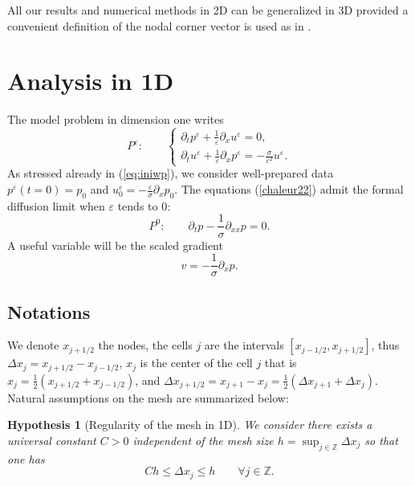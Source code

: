 \documentclass[a4paper,french,english,10pt]{article}
\newcommand\eps{\varepsilon}
\newcommand{\dx}{\partial_x}
\newcommand{\dt}{\partial_t}
\newtheorem{hyp}[theorem]{Hypothesis}
\begin{document}
All our results and numerical methods in 2D can be generalized in 3D 
provided a convenient definition of the nodal corner vector is used as in \cite{de10}.
 
\section{Analysis in 1D} \label{sec:2}



The model problem in dimension one writes
\begin{equation}\label{chaleur22}
P^\varepsilon: \qquad
 \left \{
\begin{array}{lll}
\partial_t p^{\eps} + \frac{1}{\eps}\partial_x u^{\eps} =0, \\
\partial_t u^{\eps} + \frac{1}{\eps}\partial_x p^{\eps} =
-\frac{\sigma}{\eps^2}u^{\eps}.
\end{array}
\right.
\end{equation}
As stressed already in (\ref{eq:iniwp}), we consider well-prepared data
$
p^\varepsilon(t=0)=p_0 $  and  $u_0^\varepsilon=-\frac\varepsilon \sigma \partial_{x}p_0$.
The equations (\ref{chaleur22}) 
admit the formal diffusion limit when $\eps$ tends to $0$:
\begin{equation}\label{difffff}
P^0: \qquad 
\dt p -\frac{1}{\sigma}\partial_{xx}p=0.
\end{equation}
A useful variable will be  the scaled gradient  
\begin{equation} \label{eq:diff-v}
v=-\frac{1}{\sigma}\dx p.
\end{equation}

\subsection{Notations}
We denote $x_{j+1/2}$ the nodes, the cells $j$ are the intervals $[x_{j-1/2},x_{j+1/2}]$, thus $\Delta x_j=x_{j+1/2}-x_{j-1/2}$, $x_j$ is the center of the cell $j$ that is $x_j =\frac12(x_{j+1/2}+x_{j-1/2})$, and $\Delta x_{j+1/2}=x_{j+1}-x_j=\frac12(\Delta x_{j+1}+\Delta x_{j})$. Natural assumptions on the mesh are summarized below:

\begin{hyp}[Regularity of the mesh in 1D] \label{geometrie1d}
 We consider there exists 
a universal constant $C>0$ independent of the mesh size
$h=\sup_{j\in \mathbb Z} \Delta x_j $
so that one has 
$$
Ch \leq \Delta x_j \leq h \qquad \forall j \in \mathbb{Z}.
$$
\end{hyp}
\end{document}

